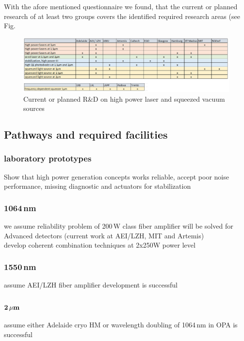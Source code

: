 With the afore mentioned questionnaire we found, that the current or planned research of at least two groups covers the identified required research areas (see Fig. 
\begin{figure}[h]
\includegraphics[scale=0.5]{Light_source_Fig1.png}
\caption{Current or planned R\&D on high power laser and squeezed vacuum sources}
\label{fig:LightSourceRD}
\end{figure}

\subsection{Pathways and required facilities}
\subsubsection{laboratory prototypes}
Show that high power generation concepts works reliable, accept poor noise performance, missing diagnostic and actuators for stabilization
\subsubsection*{1064\,nm}
we assume reliability problem of 200\,W class fiber amplifier will be solved for Advanced detectors (current work at AEI/LZH, MIT and Artemis)\\
develop coherent combination techniques at 2x250W power level
\subsubsection*{1550\,nm}
assume AEI/LZH fiber amplifier development is successful
\subsubsection*{$\rm \bf 2\,\mu m$}
assume either Adelaide cryo HM or wavelength doubling of 1064\,nm in OPA is successful
